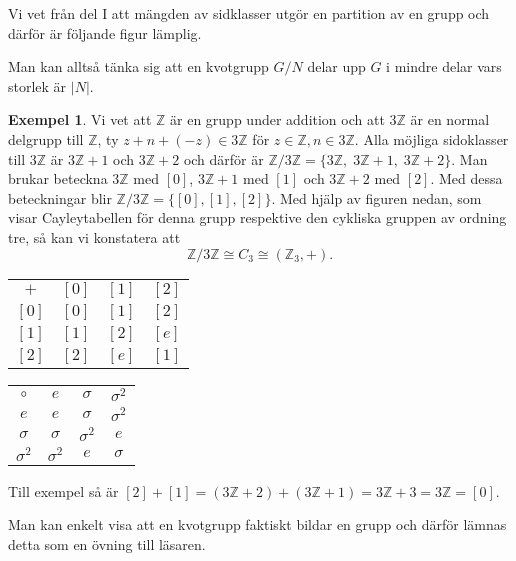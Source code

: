 \documentclass{article}
\theoremstyle{definition}
\newtheorem{exmp}[thm]{Exempel}
\begin{document}
Vi vet från del I att mängden av sidklasser utgör en partition av en grupp och därför är följande figur lämplig.

\begin{center}
\end{center}
Man kan alltså tänka sig att en kvotgrupp $G/N$ delar upp $G$ i mindre delar vars storlek är $|N|$. 

\begin{exmp}
  Vi vet att $\mathbb{Z}$ är en grupp under addition och att $3 \mathbb{Z}$ är en normal delgrupp till $\mathbb{Z}$, ty $z + n + (-z) \in 3 \mathbb{Z}$
  för $z \in \mathbb{Z}, n \in 3 \mathbb{Z}$. Alla möjliga sidoklasser till $3 \mathbb{Z}$ är $3 \mathbb{Z} + 1$ och $3 \mathbb{Z} + 2$ och därför är 
  $\mathbb{Z} / 3\mathbb{Z} = \{3 \mathbb{Z}, \; 3 \mathbb{Z} + 1, \; 3 \mathbb{Z} + 2\}$. Man brukar beteckna $3 \mathbb{Z}$ med $[0]$, 
  $3 \mathbb{Z} + 1$ med $[1]$ och $3 \mathbb{Z} + 2$ med $[2]$. Med dessa beteckningar blir $\mathbb{Z} / 3\mathbb{Z} = \{[0], [1], [2]\}$. 
  Med hjälp av figuren 
  nedan, som visar Cayleytabellen för denna grupp respektive den cykliska gruppen av ordning tre, så kan vi konstatera att
  \[\mathbb{Z} / 3\mathbb{Z} \cong C_3 \cong (\mathbb{Z}_3, +).\]
  \begin{center}
    \begin{tabular}{c | c c c}
      $+$ & $[0]$ & $[1]$ & $[2]$  \\
      \cline{1-4}
      $[0]$ & $[0]$ & $[1]$ & $[2]$ \\
      $[1]$ & $[1]$  & $[2]$ & $[e]$\\
      $[2]$ & $[2]$ & $[e]$  & $[1]$\\
    \end{tabular} 
    \qquad
    \begin{tabular}{c | c c c}
      $\circ$ & $e$ & $\sigma$ & $\sigma^2$ \\
      \cline{1-4}
      $e$ & $e$ & $\sigma$ & $\sigma^2$ \\
      $\sigma$ & $\sigma$ & $\sigma^2$  & $e$\\
      $\sigma^2$ & $\sigma^2$ & $e$ & $\sigma$
    \end{tabular}
  \end{center}
  Till exempel så är $[2] + [1] = (3 \mathbb{Z} + 2) + (3 \mathbb{Z} + 1) = 3\mathbb{Z} + 3 = 3 \mathbb{Z} = [0].$
\end{exmp}
Man kan enkelt visa att en kvotgrupp faktiskt bildar en grupp och därför lämnas detta som en övning till läsaren.
\end{document}
